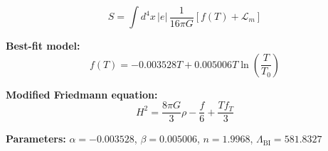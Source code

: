 
\begin{equation}
  S = \int d^4x \, |e| \, \frac{1}{16\pi G} \left[ f(T) + \mathcal{L}_m \right]
\end{equation}

\textbf{Best-fit model:}
\begin{equation}
  f(T) = -0.003528 T + 0.005006 T \ln\!\left(\frac{T}{T_0}\right)
\end{equation}

\textbf{Modified Friedmann equation:}
\begin{equation}
  H^2 = \frac{8\pi G}{3} \rho - \frac{f}{6} + \frac{T f_T}{3}
\end{equation}

\textbf{Parameters:}
$\alpha = -0.003528$, \quad
$\beta = 0.005006$, \quad
$n = 1.9968$, \quad
$\Lambda_{\text{BI}} = 581.8327$